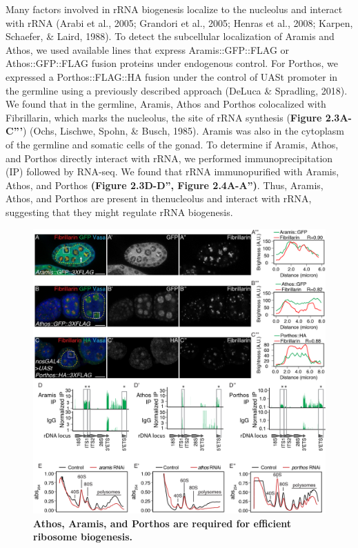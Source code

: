 \documentclass[12pt,oneside]{reedthesis}
\begin{document}
Many factors involved in rRNA biogenesis localize to the nucleolus and interact with rRNA (Arabi et al., 2005; Grandori et al., 2005; Henras et al., 2008; Karpen, Schaefer, \& Laird, 1988). To detect the subcellular localization of Aramis and Athos, we used available lines that express Aramis::GFP::FLAG or Athos::GFP::FLAG fusion proteins under endogenous control. For Porthos, we expressed a Porthos::FLAG::HA fusion under the control of UASt promoter in the germline using a previously described approach (DeLuca \& Spradling, 2018). We found that in the germline, Aramis, Athos and Porthos colocalized with Fibrillarin, which marks the nucleolus, the site of rRNA synthesis (\textbf{Figure 2.3A-C'''}) (Ochs, Lischwe, Spohn, \& Busch, 1985). Aramis was also in the cytoplasm of the germline and somatic cells of the gonad. To determine if Aramis, Athos, and Porthos directly interact with rRNA, we performed immunoprecipitation (IP) followed by RNA-seq. We found that rRNA immunopurified with Aramis, Athos, and Porthos \textbf{(Figure 2.3D-D'', Figure 2.4A-A'')}. Thus, Aramis, Athos, and Porthos are present in thenucleolus and interact with rRNA, suggesting that they might regulate rRNA biogenesis.
\begin{figure}

{\centering \includegraphics[width=6.5 in,height=6.347059 in]{./figure/Ribosome Biogenesis/Ribosome Biogenesis 2} 

}

\caption[\textbf{Athos, Aramis, and Porthos are required for efficient ribosome biogenesis.}]{\textbf{Athos, Aramis, and Porthos are required for efficient ribosome biogenesis.}}\label{fig:unnamed-chunk-3}
\end{figure}
\end{document}

